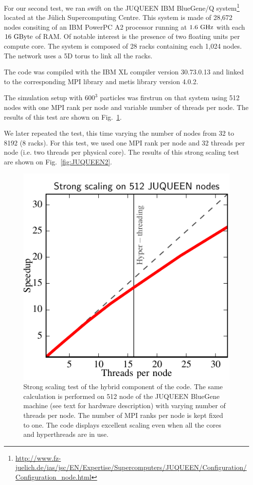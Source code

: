 \documentclass{sig-alternate-05-2015}
\newcommand{\swift}{{\sc swift}\xspace}
\begin{document}
For our second test, we ran \swift on the JUQUEEN IBM BlueGene/Q
system\footnote{\url{http://www.fz-juelich.de/ias/jsc/EN/Expertise/Supercomputers/JUQUEEN/Configuration/Configuration_node.html}}
located at the J\"ulich Supercomputing Centre. This system is made of 28,672
nodes consiting of an IBM PowerPC A2 processor running at $1.6~\rm{GHz}$ with
each $16~\rm{GByte}$ of RAM. Of notable interest is the presence of two floating
units per compute core. The system is composed of 28 racks containing each 1,024
nodes. The network uses a 5D torus to link all the racks.

The code was compiled with the IBM XL compiler version \textsc{30.73.0.13} and
linked to the corresponding MPI library and metis library
version \textsc{4.0.2}.

The simulation setup with $600^3$ particles was firstrun on that system using
512 nodes with one MPI rank per node and variable number of threads per
node. The results of this test are shown on Fig.~\ref{fig:JUQUEEN1}.

We later repeated the test, this time varying the number of nodes from 32 to
8192 (8 racks).  For this test, we used one MPI rank per node and 32 threads per
node (i.e. two threads per physical core). The results of this strong scaling
test are shown on Fig.~\ref{fig:JUQUEEN2}.


\begin{figure}
\centering
\includegraphics[width=\columnwidth]{Figures/scalingInNode}
\caption{Strong scaling test of the hybrid component of the code. The
  same calculation is performed on 512 node of the JUQUEEN BlueGene
  machine (see text for hardware description) with varying number of
  threads per node. The number of MPI ranks per node is kept fixed to
  one. The code displays excellent scaling even when all the cores and
  hyperthreads are in use. \label{fig:JUQUEEN1}}
\end{figure}  
\end{document}
